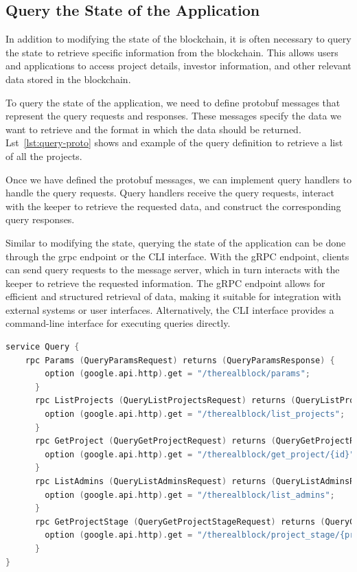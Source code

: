 \subsection{Query the State of the Application}

In addition to modifying the state of the blockchain, it is often necessary to query the state to retrieve specific information from the blockchain. This allows users and applications to access project details, investor information, and other relevant data stored in the blockchain.

To query the state of the application, we need to define protobuf messages that represent the query requests and responses. These messages specify the data we want to retrieve and the format in which the data should be returned. Lst~\ref{lst:query-proto} shows and example of the query definition to retrieve a list of all the projects.

Once we have defined the protobuf messages, we can implement query handlers to handle the query requests. Query handlers receive the query requests, interact with the keeper to retrieve the requested data, and construct the corresponding query responses.

Similar to modifying the state, querying the state of the application can be done through the \gls{grpc} endpoint or the CLI interface. With the gRPC endpoint, clients can send query requests to the message server, which in turn interacts with the keeper to retrieve the requested information. The gRPC endpoint allows for efficient and structured retrieval of data, making it suitable for integration with external systems or user interfaces. Alternatively, the CLI interface provides a command-line interface for executing queries directly.

\begin{lstlisting}[language=go, caption=Query gRPC Definition,label={lst:query-proto}]
service Query {
    rpc Params (QueryParamsRequest) returns (QueryParamsResponse) {
        option (google.api.http).get = "/therealblock/params";
      }
      rpc ListProjects (QueryListProjectsRequest) returns (QueryListProjectsResponse) {
        option (google.api.http).get = "/therealblock/list_projects";
      } 
      rpc GetProject (QueryGetProjectRequest) returns (QueryGetProjectResponse) {
        option (google.api.http).get = "/therealblock/get_project/{id}";
      }
      rpc ListAdmins (QueryListAdminsRequest) returns (QueryListAdminsResponse) {
        option (google.api.http).get = "/therealblock/list_admins";
      }
      rpc GetProjectStage (QueryGetProjectStageRequest) returns (QueryGetProjectStageResponse) {
        option (google.api.http).get = "/therealblock/project_stage/{projectId}";
      }
}
\end{lstlisting}

